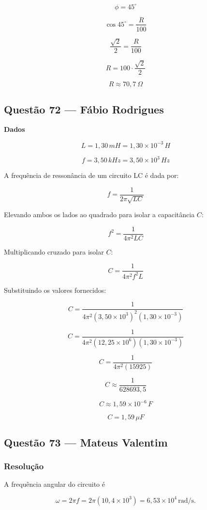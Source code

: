 \documentclass[12pt,a4paper]{article}
\begin{document}
\[
\phi=45^\circ
\]

\[
\cos45^\circ=\frac{R}{100}
\]

\[
\frac{\sqrt2}{2}=\frac{R}{100}
\]

\[
R=100\cdot\frac{\sqrt2}{2}
\]

\[
R\approx70,7\ \Omega
\]


\subsection{Questão 72 — Fábio Rodrigues}
\textbf{Dados}

\[
L = 1,30\,mH = 1,30 \times 10^{-3}\,H
\]

\[
f = 3,50\,kHz = 3,50 \times 10^3\,Hz
\]

A frequência de ressonância de um circuito LC é dada por:

\[
f = \frac{1}{2\pi\sqrt{LC}}
\]

Elevando ambos os lados ao quadrado para isolar a capacitância \(C\):

\[
f^2 = \frac{1}{4\pi^2 L C}
\]

Multiplicando cruzado para isolar \(C\):

\[
C = \frac{1}{4\pi^2 f^2 L}
\]

Substituindo os valores fornecidos:

\[
C = \frac{1}{4\pi^2 (3,50 \times 10^3)^2 (1,30 \times 10^{-3})}
\]

\[
C = \frac{1}{4\pi^2 (12,25 \times 10^6) (1,30 \times 10^{-3})}
\]

\[
C = \frac{1}{4\pi^2 (15925)}
\]

\[
C \approx \frac{1}{628693,5}
\]

\[
C \approx 1,59 \times 10^{-6}\,F
\]

\[
\boxed{C = 1,59\,\mu F}
\]

\subsection{Questão 73 — Mateus Valentim}
\subsubsection{Resolução}

A frequência angular do circuito é

\[
\omega=2\pi f
=2\pi(10{,}4\times 10^3)
=6{,}53\times 10^4\,\text{rad/s}.
\]
\end{document}
